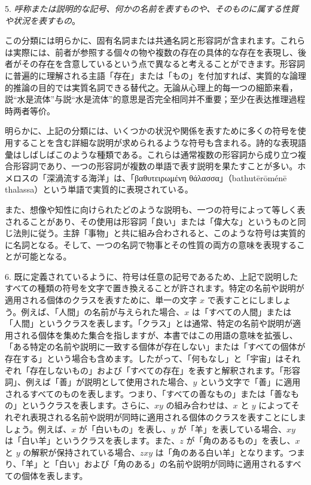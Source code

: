 \documentclass[a4paper,11pt,openany]{ltjsbook}
\begin{document}
5. \textit{呼称または説明的な記号、何かの名前を表すものや、そのものに属する性質や状況を表すもの}。

この分類には明らかに、固有名詞または共通名詞と形容詞が含まれます。これらは実際には、前者が参照する個々の物や複数の存在の具体的な存在を表現し、後者がその存在を含意しているという点で異なると考えることができます。形容詞に普遍的に理解される主語「存在」または「もの」を付加すれば、実質的な論理的推論の目的では実質名詞できる替代之。无論从心理上的每一つの細節来看，説“水是流体”与説“水是流体”的意思是否完全相同并不重要；至少在表达推理過程時两者等价。

明らかに、上記の分類には、いくつかの状況や関係を表すために多くの符号を使用することを含む詳細な説明が求められるような符号も含まれる。詩的な表現語彙はしばしばこのような種類である。これらは通常複数の形容詞から成り立つ複合形容詞であり、一つの形容詞が複数の単語で表す説明を果たすことが多い。ホメロスの「深渦流する海洋」は、「βαθυτειρωμένη θάλασσα」（bathutērōménē thalassa）という単語で実質的に表現されている。

また、想像や知性に向けられたどのような説明も、一つの符号によって等しく表されることがあり、その使用は形容詞「良い」または「偉大な」というものと同じ法則に従う。主辞「事物」と共に組み合わされると、このような符号は実質的に名詞となる。そして、一つの名詞で物事とその性質の両方の意味を表現することが可能となる。

6. 既に定義されているように、符号は任意の記号であるため、上記で説明したすべての種類の符号を文字で置き換えることが許されます。特定の名前や説明が適用される個体のクラスを表すために、単一の文字 $x$ で表すことにしましょう。例えば、「人間」の名前が与えられた場合、$x$ は「すべての人間」または「人間」というクラスを表します。「クラス」とは通常、特定の名前や説明が適用される個体を集めた集合を指しますが、本書ではこの用語の意味を拡張し、「ある特定の名前や説明に一致する個体が存在しない」または「すべての個体が存在する」という場合も含めます。したがって、「何もなし」と「宇宙」はそれぞれ「存在しないもの」および「すべての存在」を表すと解釈されます。「形容詞」、例えば「善」が説明として使用された場合、$y$ という文字で「善」に適用されるすべてのものを表します。つまり、「すべての善なもの」または「善なもの」というクラスを表します。さらに、$xy$ の組み合わせは、$x$ と $y$ によってそれぞれ表現される名前や説明が同時に適用される個体のクラスを表すことにしましょう。例えば、$x$ が「白いもの」を表し、$y$ が「羊」を表している場合、$xy$ は「白い羊」というクラスを表します。また、$z$ が「角のあるもの」を表し、$x$ と $y$ の解釈が保持されている場合、$zxy$ は「角のある白い羊」となります。つまり、「羊」と「白い」および「角のある」の名前や説明が同時に適用されるすべての個体を表します。
\end{document}

